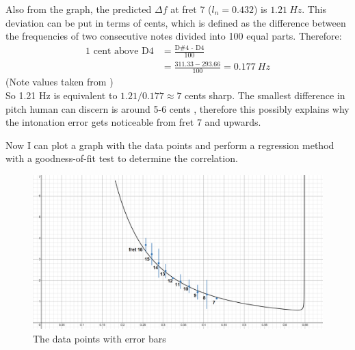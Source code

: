Also from the graph, the predicted $\Delta f$ at fret 7 ($l_n = 0.432$) is $\SI{1.21}{Hz}$. This deviation can be put in terms of cents, which is defined as the difference between the frequencies of two consecutive notes divided into 100 equal parts. \cite{cents} Therefore:
\begin{align*}
    \text{1 cent above D4} &= \frac{\text{D\#4 - D4}}{100} \\  
    &= \frac{311.33-293.66}{100} = \SI{0.177}{Hz} 
\end{align*}
(Note values taken from \cite{freq_chart}) \\
So 1.21 Hz is equivalent to $1.21/0.177 \approx 7$ cents sharp. The smallest difference in pitch human can discern is around 5-6 cents \cite{loeffler}, therefore this possibly explains why the intonation error gets noticeable from fret 7 and upwards. \par
Now I can plot a graph with the data points and perform a regression method with a goodness-of-fit test to determine the correlation.
\begin{figure}[!h]
    \includegraphics[width = \textwidth]{./ee/graph_with_data.png}
    \caption{The data points with error bars} \label{fig10}
\end{figure}